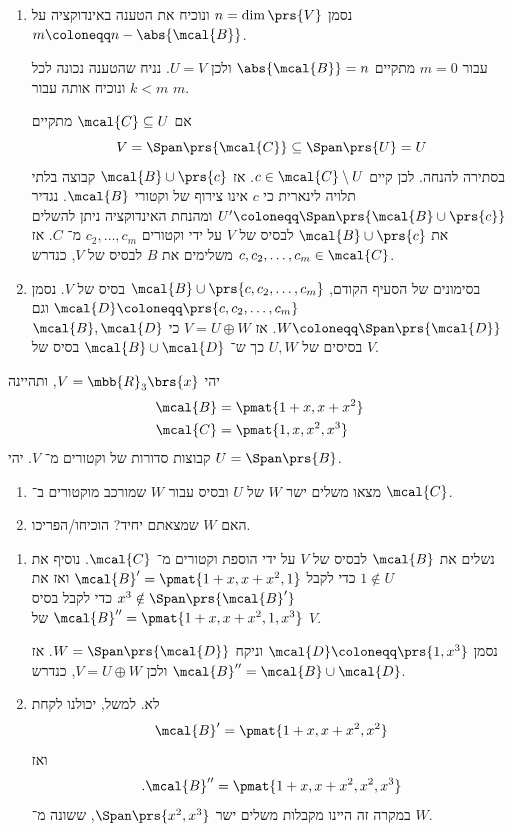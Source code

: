 \documentclass[a4paper,10pt,twoside,openany]{book}
\begin{document}
\begin{solution}
\begin{enumerate}
\item נסמן
$n = \dim\prs{V}$
ונוכיח את הטענה באינדוקציה על
$m \coloneqq n - \abs{\mcal{B}}$.

עבור
$m = 0$
מתקיים
$\abs{\mcal{B}} = n$
ולכן
$U = V$.
נניח שהטענה נכונה לכל
$k < m$
ונוכיח אותה עבור
$m$.

אם
$\mcal{C} \subseteq U$
מתקיים
\[V = \Span\prs{\mcal{C}} \subseteq \Span\prs{U} = U\]
בסתירה להנחה. לכן קיים
$c \in \mcal{C} \setminus U$.
אז
$\mcal{B} \cup \prs{c}$
קבוצה בלתי תלויה לינארית כי
$c$
אינו צירוף של וקטורי
$\mcal{B}$.
נגדיר
$U' \coloneqq \Span\prs{\mcal{B} \cup \prs{c}}$
ומהנחת האינדוקציה ניתן להשלים את
$\mcal{B} \cup \prs{c}$
לבסיס של
$V$
על ידי וקטורים
$c_2, \ldots, c_m$
מ־%
$C$.
אז
$c, c_2, \ldots, c_m \in \mcal{C}$
משלימים את
$B$
לבסיס של
$V$,
כנדרש.

\item בסימונים של הסעיף הקודם,
$\mcal{B} \cup \prs{c, c_2, \ldots, c_m}$
בסיס של
$V$.
נסמן
$\mcal{D} \coloneqq \prs{c, c_2, \ldots, c_m}$
וגם
$W \coloneqq \Span\prs{\mcal{D}}$.
אז
$V = U \oplus W$
כי
$\mcal{B},\mcal{D}$
בסיסים של
$U,W$
כך ש־%
$\mcal{B} \cup \mcal{D}$
בסיס של
$V$.
\end{enumerate}
\end{solution}

\begin{exercisechap}
 יהי
$V = \mbb{R}_3\brs{x}$,
ותהיינה
\begin{align*}
\mcal{B} &= \pmat{1 + x, x + x^2} \\
\mcal{C} &= \pmat{1,x,x^2,x^3}
\end{align*}
קבוצות סדורות של וקטורים מ־%
$V$.
יהי
$U = \Span\prs{B}$.

\begin{enumerate}
\item מצאו משלים 
ישר
$W$
של
$U$
ובסיס עבור
$W$
שמורכב מוקטורים ב־%
$\mcal{C}$.

\item האם
$W$
שמצאתם יחיד? הוכיחו/הפריכו.
\end{enumerate}
\end{exercisechap}

\begin{solution}
\begin{enumerate}
\item נשלים את
$\mcal{B}$
לבסיס של
$V$
על ידי הוספת וקטורים מ־%
$\mcal{C}$.
נוסיף את
$1 \notin U$
כדי לקבל
$\mcal{B}' = \pmat{1 + x, x + x^2, 1}$
ואז את
$x^3 \notin \Span\prs{\mcal{B}'}$
כדי לקבל בסיס
$\mcal{B}'' = \pmat{1 + x, x + x^2, 1, x^3}$
של
$V$.

נסמן
$\mcal{D} \coloneqq \prs{1, x^3}$
וניקח
$W = \Span\prs{\mcal{D}}$.
אז
$\mcal{B}'' = \mcal{B} \cup \mcal{D}$
ולכן
$V = U \oplus W$,
כנדרש.

\item לא.
למשל, יכולנו לקחת
\[\mcal{B}' = \pmat{1 + x, x + x^2, x^2}\]
ואז
\[\text{.} \mcal{B}'' = \pmat{1 + x, x + x^2, x^2, x^3}\]
במקרה זה היינו מקבלות משלים ישר
$\Span\prs{x^2, x^3}$,
ששונה מ־%
$W$.
\end{enumerate}
\end{solution}
\end{document}
